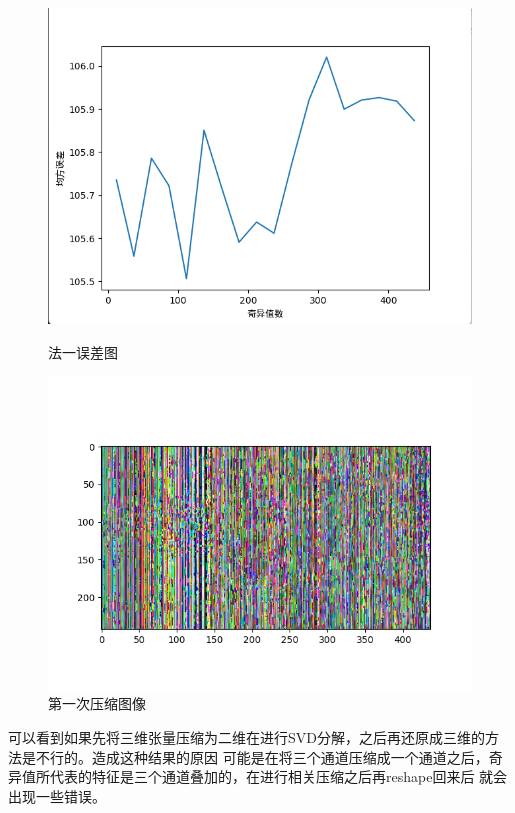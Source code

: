 \documentclass[UTF8]{ctexart}
\begin{document}
  \begin{figure}[htbp]
    \centering
    \begin{minipage}{0.4\textwidth}
      \centering
      \includegraphics[width=\textwidth]{1.png}
      \caption{法一误差图}
      \label{fig:subfig1}
    \end{minipage}
    \hspace{1cm} %
    \begin{minipage}{0.4\textwidth}
      \centering
      \includegraphics[width=\textwidth]{2.png}
      \caption{第一次压缩图像}
      \label{fig:subfig2}
    \end{minipage}
  
    \label{fig:combined}
    \end{figure}
可以看到如果先将三维张量压缩为二维在进行SVD分解，之后再还原成三维的方法是不行的。造成这种结果的原因
可能是在将三个通道压缩成一个通道之后，奇异值所代表的特征是三个通道叠加的，在进行相关压缩之后再reshape回来后
就会出现一些错误。
\end{document}
